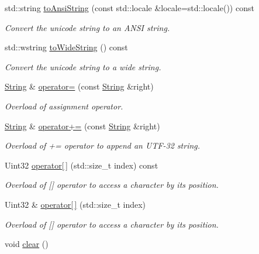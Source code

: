 \begin{DoxyCompactItemize}
std\-::string \hyperlink{classsf_1_1String_a71d111ccfaf295b8b8be8ca4a3ceb5f4}{to\-Ansi\-String} (const std\-::locale \&locale=std\-::locale()) const 
\begin{DoxyCompactList}\small\item\em Convert the unicode string to an A\-N\-S\-I string. \end{DoxyCompactList}\item 
std\-::wstring \hyperlink{classsf_1_1String_afd8b085ad7255543e4dc1285389d2d82}{to\-Wide\-String} () const 
\begin{DoxyCompactList}\small\item\em Convert the unicode string to a wide string. \end{DoxyCompactList}\item 
\hyperlink{classsf_1_1String}{String} \& \hyperlink{classsf_1_1String_a096255c066e5ef8c31952216b8ce9c42}{operator=} (const \hyperlink{classsf_1_1String}{String} \&right)
\begin{DoxyCompactList}\small\item\em Overload of assignment operator. \end{DoxyCompactList}\item 
\hyperlink{classsf_1_1String}{String} \& \hyperlink{classsf_1_1String_ae6563ce2c243ae2160eea8a354199f4e}{operator+=} (const \hyperlink{classsf_1_1String}{String} \&right)
\begin{DoxyCompactList}\small\item\em Overload of += operator to append an U\-T\-F-\/32 string. \end{DoxyCompactList}\item 
Uint32 \hyperlink{classsf_1_1String_a649b89a65866bf03652f7b5cb6de3bb6}{operator\mbox{[}$\,$\mbox{]}} (std\-::size\-\_\-t index) const 
\begin{DoxyCompactList}\small\item\em Overload of \mbox{[}\mbox{]} operator to access a character by its position. \end{DoxyCompactList}\item 
Uint32 \& \hyperlink{classsf_1_1String_abc989da7f4fb873ab29188d40772ab24}{operator\mbox{[}$\,$\mbox{]}} (std\-::size\-\_\-t index)
\begin{DoxyCompactList}\small\item\em Overload of \mbox{[}\mbox{]} operator to access a character by its position. \end{DoxyCompactList}\item 
void \hyperlink{classsf_1_1String_a391c1b4950cbf3d3f8040cea73af2969}{clear} ()

\end{DoxyCompactItemize}

